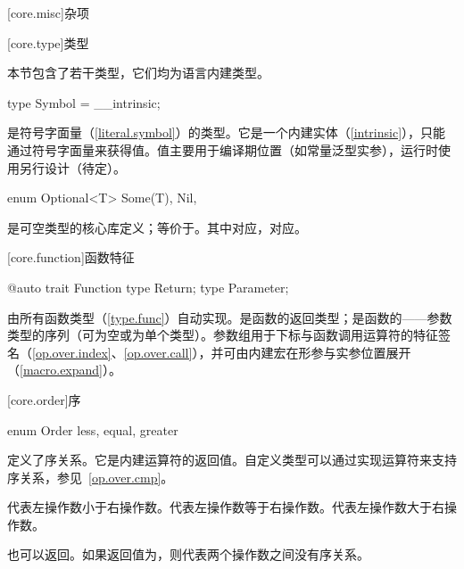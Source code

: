 
[core.misc]{杂项}

[core.type]{类型}

\pnum
本节包含了若干类型，它们均为语言内建类型。

\begin{itemdecl}
type Symbol = __intrinsic;
\end{itemdecl}

\pnum
{}是符号字面量（\ref{literal.symbol}）的类型。它是一个内建实体（\ref{intrinsic}），只能通过符号字面量来获得值。值主要用于编译期位置（如常量泛型实参），运行时使用另行设计（待定）。

\begin{itemdecl}
enum Optional<T> {
    Some(T),
    Nil,
}
\end{itemdecl}

\pnum
{}是可空类型的核心库定义；等价于。其中对应，对应。

[core.function]{函数特征}

\begin{itemdecl}
@auto trait Function {
    type Return;
    type Parameter;
}
\end{itemdecl}

\pnum
{}由所有函数类型（\ref{type.func}）自动实现。是函数的返回类型；是函数的——参数类型的序列（可为空或为单个类型）。参数组用于下标与函数调用运算符的特征签名（\ref{op.over.index}、\ref{op.over.call}），并可由内建宏在形参与实参位置展开（\ref{macro.expand}）。

[core.order]{序}

\begin{itemdecl}
enum Order {
    less,
    equal,
    greater
}
\end{itemdecl}

\pnum
{}定义了序关系。它是内建运算符的返回值。自定义类型可以通过实现运算符来支持序关系，参见~\ref{op.over.cmp}。

\pnum
{}代表左操作数小于右操作数。代表左操作数等于右操作数。代表左操作数大于右操作数。

\pnum
{}也可以返回。如果返回值为，则代表两个操作数之间没有序关系。

